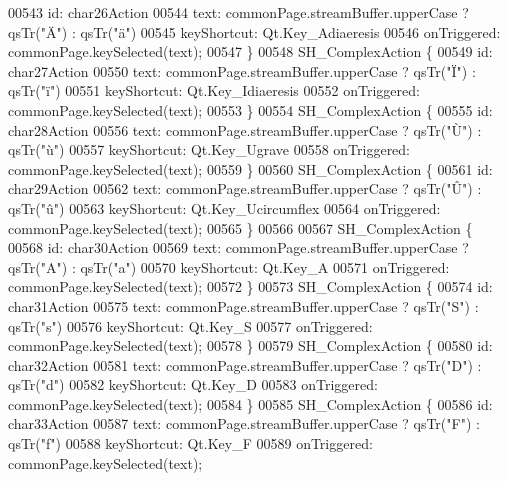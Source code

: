 \begin{DoxyCode}
00543         \textcolor{keywordtype}{id}: char26Action
00544         text: commonPage.streamBuffer.upperCase ? qsTr(\textcolor{stringliteral}{"Ä"}) : qsTr(\textcolor{stringliteral}{"ä"})
00545         keyShortcut: Qt.Key\_Adiaeresis
00546         onTriggered: commonPage.keySelected(text);
00547     \}
00548     SH\_ComplexAction \{
00549         \textcolor{keywordtype}{id}: char27Action
00550         text: commonPage.streamBuffer.upperCase ? qsTr(\textcolor{stringliteral}{"Ï"}) : qsTr(\textcolor{stringliteral}{"ï"})
00551         keyShortcut: Qt.Key\_Idiaeresis
00552         onTriggered: commonPage.keySelected(text);
00553     \}
00554     SH\_ComplexAction \{
00555         \textcolor{keywordtype}{id}: char28Action
00556         text: commonPage.streamBuffer.upperCase ? qsTr(\textcolor{stringliteral}{"Ù"}) : qsTr(\textcolor{stringliteral}{"ù"})
00557         keyShortcut: Qt.Key\_Ugrave
00558         onTriggered: commonPage.keySelected(text);
00559     \}
00560     SH\_ComplexAction \{
00561         \textcolor{keywordtype}{id}: char29Action
00562         text: commonPage.streamBuffer.upperCase ? qsTr(\textcolor{stringliteral}{"Û"}) : qsTr(\textcolor{stringliteral}{"û"})
00563         keyShortcut: Qt.Key\_Ucircumflex
00564         onTriggered: commonPage.keySelected(text);
00565     \}
00566 
00567     SH\_ComplexAction \{
00568         \textcolor{keywordtype}{id}: char30Action
00569         text: commonPage.streamBuffer.upperCase ? qsTr(\textcolor{stringliteral}{"A"}) : qsTr(\textcolor{stringliteral}{"a"})
00570         keyShortcut: Qt.Key\_A
00571         onTriggered: commonPage.keySelected(text);
00572     \}
00573     SH\_ComplexAction \{
00574         \textcolor{keywordtype}{id}: char31Action
00575         text: commonPage.streamBuffer.upperCase ? qsTr(\textcolor{stringliteral}{"S"}) : qsTr(\textcolor{stringliteral}{"s"})
00576         keyShortcut: Qt.Key\_S
00577         onTriggered: commonPage.keySelected(text);
00578     \}
00579     SH\_ComplexAction \{
00580         \textcolor{keywordtype}{id}: char32Action
00581         text: commonPage.streamBuffer.upperCase ? qsTr(\textcolor{stringliteral}{"D"}) : qsTr(\textcolor{stringliteral}{"d"})
00582         keyShortcut: Qt.Key\_D
00583         onTriggered: commonPage.keySelected(text);
00584     \}
00585     SH\_ComplexAction \{
00586         \textcolor{keywordtype}{id}: char33Action
00587         text: commonPage.streamBuffer.upperCase ? qsTr(\textcolor{stringliteral}{"F"}) : qsTr(\textcolor{stringliteral}{"f"})
00588         keyShortcut: Qt.Key\_F
00589         onTriggered: commonPage.keySelected(text);

\end{DoxyCode}
